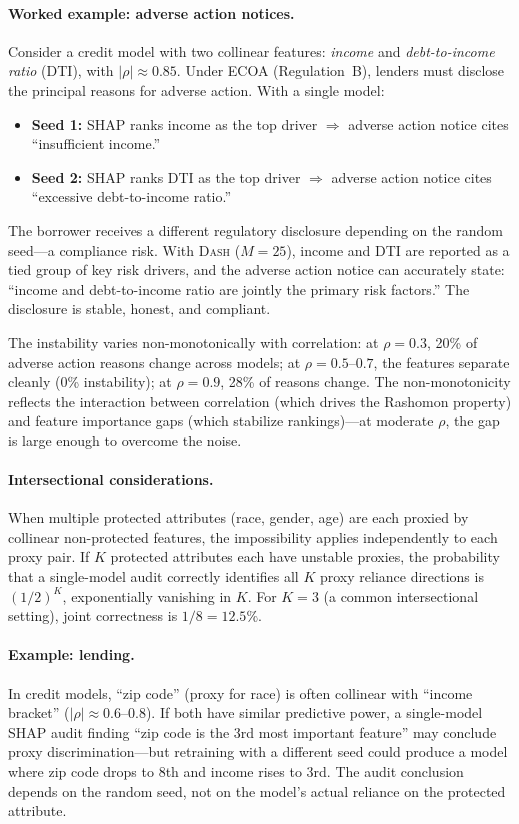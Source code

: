 \documentclass{article}
\newcommand{\DASH}{\textsc{Dash}}
\begin{document}
\paragraph{Worked example: adverse action notices.}
Consider a credit model with two collinear features: \emph{income} and \emph{debt-to-income ratio} (DTI), with $|\rho| \approx 0.85$. Under ECOA (Regulation~B), lenders must disclose the principal reasons for adverse action. With a single model:
\begin{itemize}
    \item \textbf{Seed 1:} SHAP ranks income as the top driver $\Rightarrow$ adverse action notice cites ``insufficient income.''
    \item \textbf{Seed 2:} SHAP ranks DTI as the top driver $\Rightarrow$ adverse action notice cites ``excessive debt-to-income ratio.''
\end{itemize}
The borrower receives a different regulatory disclosure depending on the random seed---a compliance risk. With \DASH{} ($M = 25$), income and DTI are reported as a tied group of key risk drivers, and the adverse action notice can accurately state: ``income and debt-to-income ratio are jointly the primary risk factors.'' The disclosure is stable, honest, and compliant.

The instability varies non-monotonically with correlation: at $\rho = 0.3$, 20\% of adverse action reasons change across models; at $\rho = 0.5$--$0.7$, the features separate cleanly (0\% instability); at $\rho = 0.9$, 28\% of reasons change. The non-monotonicity reflects the interaction between correlation (which drives the Rashomon property) and feature importance gaps (which stabilize rankings)---at moderate $\rho$, the gap is large enough to overcome the noise.

\paragraph{Intersectional considerations.}
When multiple protected attributes (race, gender, age) are each proxied by collinear non-protected features, the impossibility applies independently to each proxy pair. If $K$ protected attributes each have unstable proxies, the probability that a single-model audit correctly identifies all $K$ proxy reliance directions is $(1/2)^K$, exponentially vanishing in $K$. For $K = 3$ (a common intersectional setting), joint correctness is $1/8 = 12.5\%$.

\paragraph{Example: lending.}
In credit models, ``zip code'' (proxy for race) is often collinear with ``income bracket'' ($|\rho| \approx 0.6$--$0.8$). If both have similar predictive power, a single-model SHAP audit finding ``zip code is the 3rd most important feature'' may conclude proxy discrimination---but retraining with a different seed could produce a model where zip code drops to 8th and income rises to 3rd. The audit conclusion depends on the random seed, not on the model's actual reliance on the protected attribute.
\end{document}
